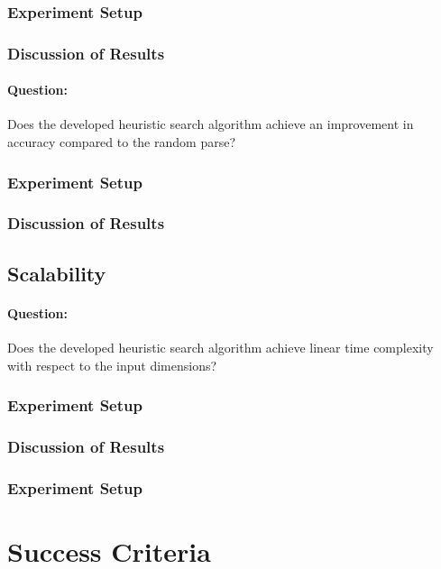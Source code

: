 \documentclass[12pt,a4paper,twoside,openany]{report} \usepackage[pdfborder={0 0 0}]{hyperref}    %
\theoremstyle{definition} \newtheorem{definition}{Definition}[section]
\begin{document}
  \subsubsection{Experiment Setup}

  \subsubsection{Discussion of Results}

  \paragraph{Question:} {Does the developed heuristic search algorithm achieve an improvement in accuracy compared to the random parse? }
  \label{sub:evalExtAcc}
  \subsubsection{Experiment Setup}

  \subsubsection{Discussion of Results}

  \subsection{Scalability}
  \paragraph{Question:} {Does the developed heuristic search algorithm achieve linear time complexity with respect to the input dimensions?}
  \label{sub:evalExtScale}
  \subsubsection{Experiment Setup}


  \subsubsection{Discussion of Results}

  \subsubsection{Experiment Setup}


\section{Success Criteria}
\label{sec:successCriteriaEval}
\end{document}
